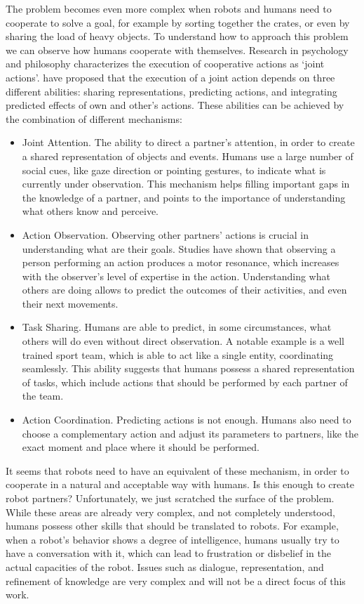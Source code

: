 The problem becomes even more complex when robots and humans need to cooperate to solve a goal, for example by sorting together the crates, or even by sharing the load of heavy objects. To understand  how to approach this problem we can observe how humans cooperate with themselves. Research in psychology and philosophy \citep{pacherie2012phenomenology} characterizes the execution of cooperative actions as `joint actions'. \cite{sebanz2006joint} have proposed that the execution of a joint action depends on three different abilities: sharing representations, predicting actions, and integrating predicted effects of own and other's actions. These abilities can be achieved by the combination of different mechanisms:
\begin{itemize}
\item Joint Attention. The ability to direct a partner's attention, in order to create a shared representation of objects and events. Humans use a large number of social cues, like gaze direction or pointing gestures, to indicate what is currently under observation. This mechanism helps filling important gaps in the knowledge of a partner, and points to the importance of understanding what others know and perceive.
\item Action Observation. Observing other partners' actions is crucial in understanding what are their goals. Studies have shown that observing a person performing an action produces a motor resonance, which increases with the observer's level of expertise in the action. Understanding what others are doing allows to predict the outcomes of their activities, and even their next movements.
\item Task Sharing. Humans are able to predict, in some circumstances, what others will do  even without direct observation. A notable example is a well trained sport team, which is able to act like a single entity, coordinating seamlessly. This ability suggests that humans possess a shared representation of tasks, which include actions that should be performed by each partner of the team.
\item Action Coordination. Predicting actions is not enough. Humans also need to choose a complementary action and adjust its parameters to partners, like the exact moment and place where it should be performed. 
\end{itemize}

It seems that robots need to have an equivalent of these mechanism, in order to cooperate in a natural and acceptable way with humans. Is this enough to create robot partners? Unfortunately, we just scratched the surface of the problem. While these areas are already very complex, and not completely understood, humans possess other skills that should be translated to robots. For example, when a robot's behavior shows a degree of intelligence, humans usually try to have a conversation with it, which can lead to frustration or disbelief in the actual capacities of the robot. Issues such as dialogue, representation, and refinement of knowledge are very complex and will not be a direct focus of this work.

